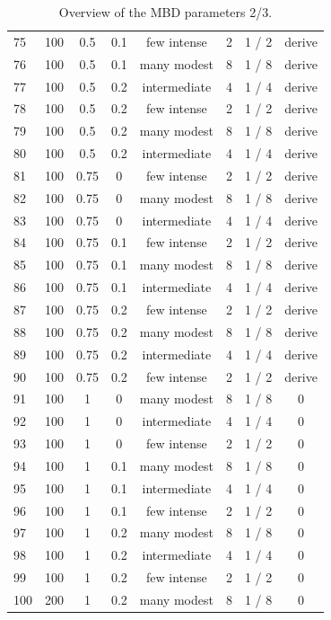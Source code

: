 \documentclass{article}
\begin{document}
\begin{table}
\begin{tabular}{ l | c | c | c | c   c   c | c }
75 & 100 & 0.5 & 0.1 & few intense & 2 & 1 / 2 & derive \\
76 & 100 & 0.5 & 0.1 & many modest  & 8 & 1 / 8 & derive \\
77 & 100 & 0.5 & 0.2 & intermediate & 4 & 1 / 4 & derive \\
78 & 100 & 0.5 & 0.2 & few intense & 2 & 1 / 2 & derive \\
79 & 100 & 0.5 & 0.2 & many modest  & 8 & 1 / 8 & derive \\
80 & 100 & 0.5 & 0.2 & intermediate & 4 & 1 / 4 & derive \\
81 & 100 & 0.75 & 0 & few intense & 2 & 1 / 2 & derive \\
82 & 100 & 0.75 & 0 & many modest  & 8 & 1 / 8 & derive \\
83 & 100 & 0.75 & 0 & intermediate & 4 & 1 / 4 & derive \\
84 & 100 & 0.75 & 0.1 & few intense & 2 & 1 / 2 & derive \\
85 & 100 & 0.75 & 0.1 & many modest  & 8 & 1 / 8 & derive \\
86 & 100 & 0.75 & 0.1 & intermediate & 4 & 1 / 4 & derive \\
87 & 100 & 0.75 & 0.2 & few intense & 2 & 1 / 2 & derive \\
88 & 100 & 0.75 & 0.2 & many modest  & 8 & 1 / 8 & derive \\
89 & 100 & 0.75 & 0.2 & intermediate & 4 & 1 / 4 & derive \\
90 & 100 & 0.75 & 0.2 & few intense & 2 & 1 / 2 & derive \\
91 & 100 & 1 & 0 & many modest  & 8 & 1 / 8 & 0 \\
92 & 100 & 1 & 0 & intermediate & 4 & 1 / 4 & 0 \\
93 & 100 & 1 & 0 & few intense & 2 & 1 / 2 & 0 \\
94 & 100 & 1 & 0.1 & many modest  & 8 & 1 / 8 & 0 \\
95 & 100 & 1 & 0.1 & intermediate & 4 & 1 / 4 & 0 \\
96 & 100 & 1 & 0.1 & few intense & 2 & 1 / 2 & 0 \\
97 & 100 & 1 & 0.2 & many modest  & 8 & 1 / 8 & 0 \\
98 & 100 & 1 & 0.2 & intermediate & 4 & 1 / 4 & 0 \\
99 & 100 & 1 & 0.2 & few intense & 2 & 1 / 2 & 0 \\
100 & 200 & 1 & 0.2 & many modest  & 8 & 1 / 8 & 0 \\
    \hline
  \end{tabular}
  \caption{
    Overview of the MBD parameters 2/3. 
  }
  \label{table:mbd_parameters_2}
\end{table}
\end{document}
